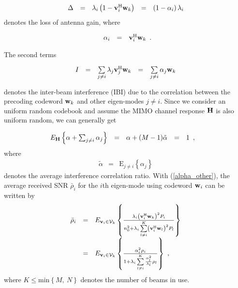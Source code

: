 \documentclass[10pt,fleqn, twocolumn]{IEEEtran}
\newcommand{\bH}{{\bf H}}
\newcommand{\bv}{{\bf v}}
\newcommand{\bw}{{\bf w}}
\begin{document}
\begin{equation}
\begin{array}{rcccl}
\Delta&=&\lambda_{i}\left(1-\bv_{i}^{\rm
H}\bw_k\right)&=&\left(1-\alpha_{i}\right)\lambda_{i}
\end{array}
\end{equation}
\noindent denotes the loss of antenna gain, where

\begin{equation}
\begin{array}{rcl}
\alpha_{i}&=&\bv_{i}^{\rm H}\bw_k
\end{array}.\label{alpha}
\end{equation}

\noindent The second terms

\begin{equation}
\begin{array}{rcccl}
I_{} & = & \sum\limits_{j\neq i}\lambda_{j}\bv_{j}^{\rm
H}\bw_{k}&=&\sum\limits_{j\neq i}\alpha_{j}\bw_{k}
\end{array}\label{IBI}
\end{equation}

\noindent denotes the inter-beam interference (IBI) due to the
correlation between the precoding codeword $\bw_{k}$ and other
eigen-modes $j\neq i$. Since we consider an uniform random
codebook and assume the MIMO channel response $\bH$ is also
uniform random, we can generally get

\begin{equation}\hspace{-0.2in}
\begin{array}{rcccl}
\mbox{E}_{\bH}\left\{\alpha + \sum_{j\neq i}\alpha_{j}\right\}& =
& \alpha + (M-1) \tilde\alpha & = &1
\end{array},\label{alpha_other}
\end{equation}
\noindent where
\begin{equation}
\begin{array}{rcl}
\tilde\alpha&=&\mbox{E}_{j\neq i}\left\{\alpha_{j}\right\}
\end{array}
\end{equation}
\noindent denotes the average interference correlation ratio. With
(\ref{alpha_other}), the average received SNR $\bar\rho_{i}$ for
the $i$th eigen-mode using codeword $\bw_{i}$ can be written by
\begin{equation}
\begin{array}{rcl}
\bar\rho_{i}&=&\mbox{E}_{\bv_{i}\in{\cal
V}_{k}}\left\{\frac{\lambda_{i}\left(\bv_{i}^{\rm
H}\bw_{k}\right)^2P_{i}}{n_{0}^2+ \lambda_{i}\sum\limits_{l\neq
i}^{K}\left(\bv_{i}^{\rm H}\bw_{l}\right)^{2}P_{l}}\right\}\\
&=&\mbox{E}_{\bv_{i}\in{\cal
V}_{k}}\left\{\frac{\alpha_{i}^{2}\rho_{i}}{1+
\lambda_{i}\sum\limits_{l\neq
i}^{K}\frac{\alpha_{l}^{2}}{\lambda_{l}}\rho_{l}}\right\}\ ,
\end{array}
\end{equation}
\noindent where $K\leq\mbox{min}\left\{M,\ N\right\}$ denotes the
number of beams in use.
\end{document}
